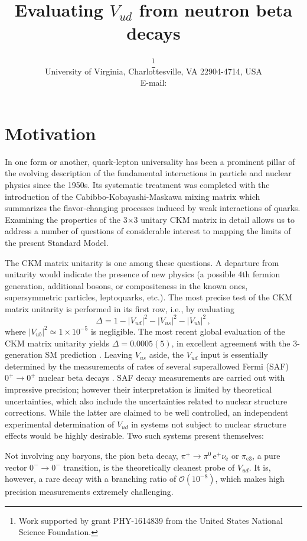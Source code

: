 \documentclass{PoS}
\title{Evaluating $V_{ud}$ from neutron beta decays}
\author{\speaker{Dinko Po\v{c}ani\'c}\thanks{Work supported by grant
    PHY-1614839 from the United States National Science Foundation.}\\
        University of Virginia, Charlottesville, VA 22904-4714, USA\\
        E-mail: \email{pocanic@virginia.edu}}
\newcommand{\peiii}{$\pi_{\text{e}3}$}
\begin{document}
\section{Motivation}

In one form or another, quark-lepton universality has been a prominent
pillar of the evolving description of the fundamental interactions in
particle and nuclear physics since the 1950s.  Its systematic treatment
was completed with the introduction of the Cabibbo-Kobayashi-Maskawa
mixing matrix \cite{Cab63,Kob73} which summarizes the flavor-changing
processes induced by weak interactions of quarks.  Examining the
properties of the 3$\times$3 unitary CKM matrix in detail allows us to
address a number of questions of considerable interest to mapping the
limits of the present Standard Model.

The CKM matrix unitarity is one among these questions.  A departure from
unitarity would indicate the presence of new physics (a possible 4th
fermion generation, additional bosons, or compositeness in the known
ones, supersymmetric particles, leptoquarks, etc.).  The most precise
test of the CKM matrix unitarity is performed in its first row, i.e., by
evaluating
\begin{equation}
   \Delta = 1 - |V_{ud}|^2 - |V_{us}|^2 - |V_{ub}|^2\,,
\end{equation} 
where $|V_{ub}|^2\simeq 1\times 10^{-5}$ is negligible.  The most recent
global evaluation of the CKM matrix unitarity yields $\Delta =
0.0005(5)$, in excellent agreement with the 3-generation SM prediction
\cite{Blu16}.  Leaving $V_{us}$ aside, the $V_{ud}$ input is essentially
determined by the measurements of rates of several superallowed Fermi
(SAF) $0^+\to 0^+$ nuclear beta decays \cite{Har15}.  SAF decay
measurements are carried out with impressive precision; however their
interpretation is limited by theoretical uncertainties, which also
include the uncertainties related to nuclear structure corrections.
While the latter are claimed to be well controlled, an independent
experimental determination of $V_{ud}$ in systems not subject to nuclear
structure effects would be highly desirable.  Two such systems present
themselves:

Not involving any baryons, the pion beta decay,
$\pi^+\to\pi^0\,\text{e}^+ \nu_{\text{e}}$ or \peiii, a pure vector
$0^-\to 0^-$ transition, is the theoretically cleanest probe of
$V_{ud}$.  It is, however, a rare decay with a branching ratio of
$\mathcal{O}(10^{-8})$, which makes high precision measurements
extremely challenging.
\end{document}

